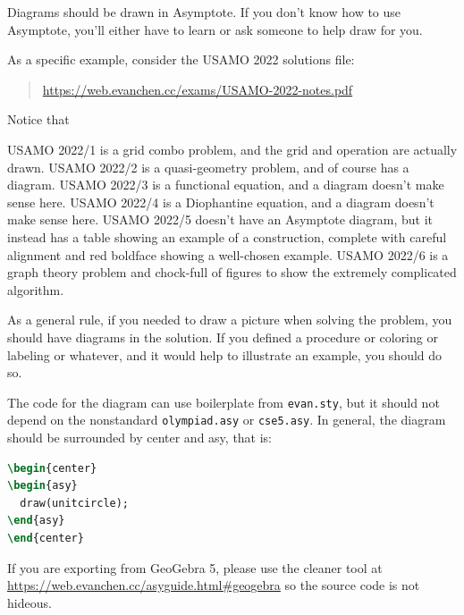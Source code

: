 \documentclass[11pt]{scrartcl}
\begin{document}
\alert{Diagrams should be drawn in Asymptote}.
If you don't know how to use Asymptote,
you'll either have to learn or ask someone to help draw for you.

As a specific example, consider the USAMO 2022 solutions file:
\begin{quote}
  \url{https://web.evanchen.cc/exams/USAMO-2022-notes.pdf}
\end{quote}
Notice that
\begin{itemize}
  \ii USAMO 2022/1 is a grid combo problem, and the grid and operation are
  actually drawn.
  \ii USAMO 2022/2 is a quasi-geometry problem, and of course has a diagram.
  \ii USAMO 2022/3 is a functional equation, and a diagram doesn't make sense here.
  \ii USAMO 2022/4 is a Diophantine equation, and a diagram doesn't make sense here.
  \ii USAMO 2022/5 doesn't have an Asymptote diagram,
  but it instead has a table showing an example of a construction,
  complete with careful alignment and red boldface showing a well-chosen example.
  \ii USAMO 2022/6 is a graph theory problem and chock-full of figures
  to show the extremely complicated algorithm.
\end{itemize}

As a general rule, if you needed to draw a picture when solving the problem,
you should have diagrams in the solution.
If you defined a procedure or coloring or labeling or whatever,
and it would help to illustrate an example, you should do so.

The code for the diagram can use boilerplate from \texttt{evan.sty},
but it should not depend on the nonstandard \texttt{olympiad.asy} or \texttt{cse5.asy}.
In general, the diagram should be surrounded by center and asy, that is:
\begin{lstlisting}[language=TeX]
\begin{center}
\begin{asy}
  draw(unitcircle);
\end{asy}
\end{center}
\end{lstlisting}

If you are exporting from GeoGebra 5, please use the cleaner tool at
\url{https://web.evanchen.cc/asyguide.html#geogebra}
so the source code is not hideous.
\end{document}
